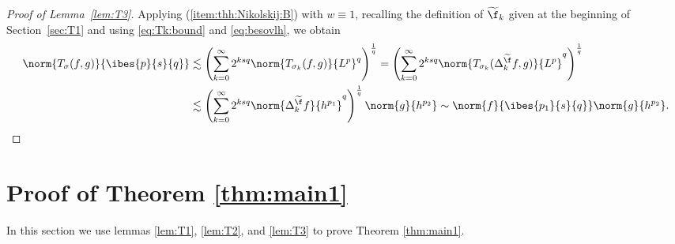 \begin{proof}[Proof of Lemma~\ref{lem:T3}]
Applying (\ref{item:thh:Nikolskij:B}) with $w\equiv 1$, recalling the definition of $\widetilde{\f}_k$ given at the beginning of Section~\ref{sec:T1} and using \eqref{eq:Tk:bound} and \eqref{eq:besovlh}, we obtain
\begin{align*}
\norm{T_\sigma(f,g)}{\ibes{p}{s}{q}}&\lesssim \left(\sum_{k=0}^\infty 2^{ksq}\norm{T_{\sigma_k}(f,g)}{L^p}^q\right)^{\frac{1}{q}}=\left(\sum_{k=0}^\infty 2^{ksq}\norm{T_{\sigma_k}(\Delta^{\widetilde{\f}}_k f,g)}{L^p}^q\right)^{\frac{1}{q}}\\
&\lesssim\left(\sum_{k=0}^\infty 2^{ksq}\norm{\Delta^{\widetilde{\f}}_k f}{h^{p_1}}^q\right)^{\frac{1}{q}}\norm{g}{h^{p_2}}\sim \norm{f}{\ibes{p_1}{s}{q}}\norm{g}{h^{p_2}}.
\end{align*}
\end{proof}
\section{Proof of Theorem \ref{thm:main1} }
In this section we use lemmas \ref{lem:T1}, \ref{lem:T2}, and \ref{lem:T3} to prove Theorem \ref{thm:main1}. 

